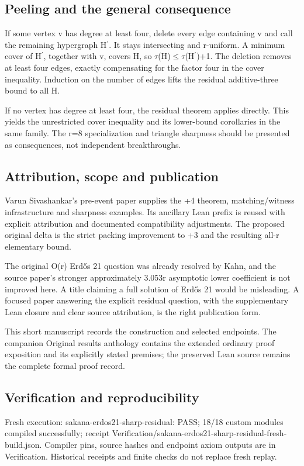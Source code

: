 \documentclass[11pt,a4paper]{article}
\begin{document}
\subsection{Peeling and the general consequence}
If some vertex v has degree at least four, delete every edge containing v and call the remaining hypergraph H\ensuremath{^{\prime}}. It stays intersecting and r-uniform. A minimum cover of H\ensuremath{^{\prime}}, together with v, covers H, so \ensuremath{\tau}(H)\ensuremath{\leq}\ensuremath{\tau}(H\ensuremath{^{\prime}})+1. The deletion removes at least four edges, exactly compensating for the factor four in the cover inequality. Induction on the number of edges lifts the residual additive-three bound to all H.

If no vertex has degree at least four, the residual theorem applies directly. This yields the unrestricted cover inequality and its lower-bound corollaries in the same family. The r=8 specialization and triangle sharpness should be presented as consequences, not independent breakthroughs.

\subsection{Attribution, scope and publication}
Varun Sivashankar's pre-event paper supplies the +4 theorem, matching/witness infrastructure and sharpness examples. Its ancillary Lean prefix is reused with explicit attribution and documented compatibility adjustments. The proposed original delta is the strict packing improvement to +3 and the resulting all-r elementary bound.

The original O(r) Erdős 21 question was already resolved by Kahn, and the source paper's stronger approximately 3.053r asymptotic lower coefficient is not improved here. A title claiming a full solution of Erdős 21 would be misleading. A focused paper answering the explicit residual question, with the supplementary Lean closure and clear source attribution, is the right publication form.

{\small This short manuscript records the construction and selected endpoints. The companion Original results anthology contains the extended ordinary proof exposition and its explicitly stated premises; the preserved Lean source remains the complete formal proof record.\par}

\subsection{Verification and reproducibility}
Fresh execution: sakana-erdos21-sharp-residual: PASS; 18/18 custom modules compiled successfully; receipt Verification/sakana-erdos21-sharp-residual-fresh-build.json. Compiler pins, source hashes and endpoint axiom outputs are in Verification. Historical receipts and finite checks do not replace fresh replay.
\end{document}
